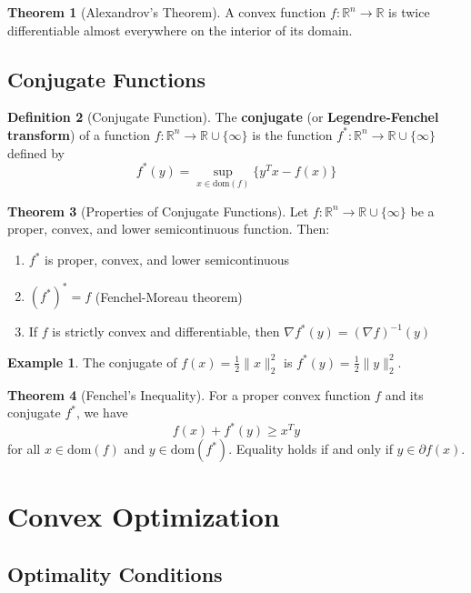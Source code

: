 \documentclass[12pt,a4paper]{article}
\theoremstyle{definition}
\newtheorem{theorem}{Theorem}[section]
\newtheorem{definition}[theorem]{Definition}
\newtheorem{example}{Example}[section]
\begin{document}
\begin{theorem}[Alexandrov's Theorem]
A convex function $f: \mathbb{R}^n \to \mathbb{R}$ is twice differentiable almost everywhere on the interior of its domain.
\end{theorem}

\subsection{Conjugate Functions}

\begin{definition}[Conjugate Function]
The \textbf{conjugate} (or \textbf{Legendre-Fenchel transform}) of a function $f: \mathbb{R}^n \to \mathbb{R} \cup \{\infty\}$ is the function $f^*: \mathbb{R}^n \to \mathbb{R} \cup \{\infty\}$ defined by
\[f^*(y) = \sup_{x \in \text{dom}(f)} \{y^T x - f(x)\}\]
\end{definition}

\begin{theorem}[Properties of Conjugate Functions]
Let $f: \mathbb{R}^n \to \mathbb{R} \cup \{\infty\}$ be a proper, convex, and lower semicontinuous function. Then:
\begin{enumerate}[label=(\roman*)]
\item $f^*$ is proper, convex, and lower semicontinuous
\item $(f^*)^* = f$ (Fenchel-Moreau theorem)
\item If $f$ is strictly convex and differentiable, then $\nabla f^*(y) = (\nabla f)^{-1}(y)$
\end{enumerate}
\end{theorem}

\begin{example}
The conjugate of $f(x) = \frac{1}{2}\|x\|_2^2$ is $f^*(y) = \frac{1}{2}\|y\|_2^2$.
\end{example}

\begin{theorem}[Fenchel's Inequality]
For a proper convex function $f$ and its conjugate $f^*$, we have
\[f(x) + f^*(y) \geq x^T y\]
for all $x \in \text{dom}(f)$ and $y \in \text{dom}(f^*)$. Equality holds if and only if $y \in \partial f(x)$.
\end{theorem}

\section{Convex Optimization}

\subsection{Optimality Conditions}
\end{document}
